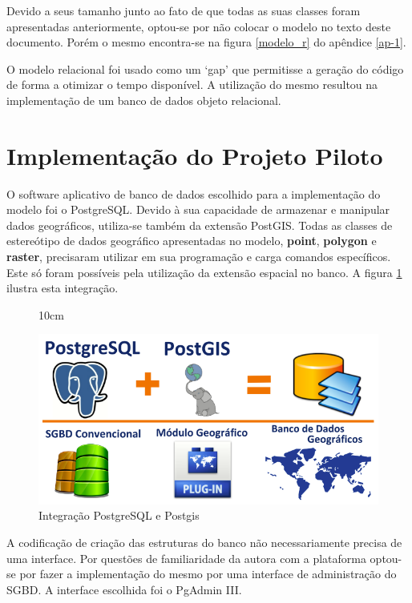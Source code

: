 Devido a seus tamanho junto ao fato de que todas as suas classes foram apresentadas anteriormente, optou-se por não colocar o modelo no texto deste documento. Porém o mesmo encontra-se na figura \ref{modelo_r} do apêndice \ref{ap-1}.

O modelo relacional foi usado como um `gap' que permitisse a geração do código de forma a otimizar o tempo disponível. A utilização do mesmo resultou na implementação de um banco de dados objeto relacional.



\section{Implementação do Projeto Piloto}

O software aplicativo de banco de dados escolhido para a implementação do modelo foi o PostgreSQL. Devido à sua capacidade de armazenar e manipular dados geográficos, utiliza-se também da extensão PostGIS. Todas as classes de estereótipo de dados geográfico apresentadas no modelo, \textbf{point}, \textbf{polygon} e \textbf{raster}, precisaram utilizar em sua programação e carga comandos específicos. Este só foram possíveis pela utilização da extensão espacial no banco. A figura \ref{postpost} ilustra esta integração.

\begin{figure}[!ht]{10cm}
  \caption{Integração PostgreSQL e Postgis} \label{postpost}
  \centering
  \includegraphics[width=1\hsize]{figuras/postgre_postgis.png}
\end{figure}

A codificação de criação das estruturas do banco não necessariamente precisa de uma interface. Por questões de familiaridade da autora com a plataforma optou-se por fazer a implementação do mesmo por uma interface de administração do SGBD. A interface escolhida foi o PgAdmin III.

